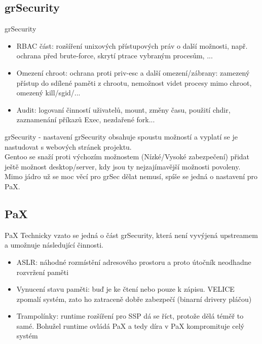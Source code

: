 \documentclass{beamer}
\begin{document}
\subsection{grSecurity}

\begin{frame}{grSecurity}
	\begin{itemize}
		\item RBAC část: rozšíření unixových přístupových práv o další možnosti, např. ochrana před brute-force, skrytí ptrace vybraným procesům, ...
		\item Omezení chroot: ochrana proti priv-esc a další omezení/zábrany: zamezený přístup do sdílené paměti z chrootu, nemožnost videt procesy mimo chroot, omezený kill/sgid/...
		\item Audit: logovaní činností uživatelů, mount, změny času, použití chdir, zaznamenání příkazů Exec, nezdařené fork...
	\end{itemize}
\end{frame}

\begin{frame}{grSecurity - nastavení}
	grSecurity obsahuje spoustu možností a vyplatí se je nastudovat s webových stránek projektu. \\
	Gentoo se snaží proti výchozím možnostem (Nízké/Vysoké zabezpečení) přidat ještě možnost desktop/server, kdy jsou ty nejzajímavější možnosti povoleny.\\
	Mimo jádro už se moc věcí pro grSec dělat nemusí, spíše se jedná o nastavení pro PaX.
\end{frame}

\subsection{PaX}

\begin{frame}{PaX}
	Technicky vzato se jedná o část grSecurity, která není vyvýjená upstreamem a umožnuje následující činnosti.
	\begin{itemize}
		\item ASLR: náhodné rozmístění adresového prostoru a proto útočník neodhadne rozvržení paměti
		\item Vynucení stavu paměti: buď je ke čtení nebo pouze k zápisu. VELICE zpomalí systém, zato ho zatraceně dobře zabezpečí (binarní drivery pláčou)
		\item Trampolínky: runtime rozšíření pro SSP dá se říct, protože dělá téměř to samé. Bohužel runtime ovládá PaX a tedy díra v PaX kompromituje celý systém
	\end{itemize}
\end{frame}
\end{document}
